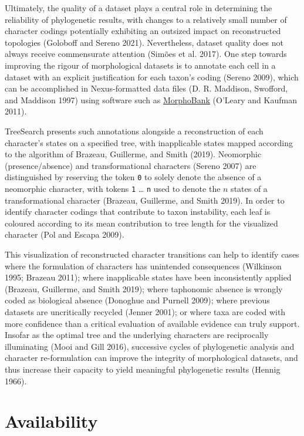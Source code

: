 Ultimately, the quality of a dataset plays a central role in determining the
reliability of phylogenetic results, with changes to a relatively small number
of character codings potentially exhibiting an outsized impact on reconstructed
topologies (Goloboff and Sereno 2021). Nevertheless, dataset quality does not always
receive commensurate attention (Simões et al. 2017). One step towards improving the
rigour of morphological datasets is to annotate each cell in a dataset with an
explicit justification for each taxon's coding (Sereno 2009), which can be
accomplished in Nexus-formatted data files (D. R. Maddison, Swofford, and Maddison 1997) using software such
as \href{https://morphobank.org}{MorphoBank} (O'Leary and Kaufman 2011).

TreeSearch presents such annotations alongside a reconstruction of each
character's states on a specified tree, with inapplicable states mapped
according to the algorithm of Brazeau, Guillerme, and Smith (2019). Neomorphic (presence/absence) and
transformational characters (Sereno 2007) are distinguished by reserving the
token \texttt{0} to solely denote the absence of a neomorphic character, with tokens
\texttt{1} \ldots{} \texttt{n} used to denote the \(n\) states of a transformational character
(Brazeau, Guillerme, and Smith 2019). In order to identify character codings that contribute to taxon
instability, each leaf is coloured according to its mean contribution to tree
length for the visualized character (Pol and Escapa 2009).

This visualization of reconstructed character transitions can help to identify
cases where the formulation of characters has unintended consequences
(Wilkinson 1995; Brazeau 2011); where inapplicable states have been
inconsistently applied (Brazeau, Guillerme, and Smith 2019); where taphonomic absence is wrongly coded
as biological absence (Donoghue and Purnell 2009); where previous datasets are uncritically
recycled (Jenner 2001); or where taxa are coded with more confidence than a
critical evaluation of available evidence can truly support. Insofar as the
optimal tree and the underlying characters are reciprocally illuminating
(Mooi and Gill 2016), successive cycles of phylogenetic analysis and character
re-formulation can improve the integrity of morphological datasets, and thus
increase their capacity to yield meaningful phylogenetic results (Hennig 1966).

\hypertarget{availability}{%
\section{Availability}\label{availability}}

